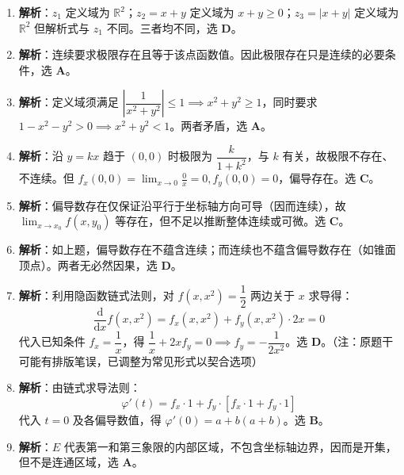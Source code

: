 \documentclass[lang=cn,11pt]{elegantbook}
\begin{document}
\begin{solution}
\begin{enumerate}
  \item \textbf{解析}：$z_1$ 定义域为 $\mathbb R^2$；$z_2=x+y$ 定义域为 $x+y \geq 0$；$z_3 = |x+y|$ 定义域为 $\mathbb R^2$ 但解析式与 $z_1$ 不同。三者均不同，选 \textbf{D}。
  \item \textbf{解析}：连续要求极限存在且等于该点函数值。因此极限存在只是连续的必要条件，选 \textbf{A}。
  \item \textbf{解析}：定义域须满足 $\left|\dfrac{1}{x^2+y^2}\right| \leq 1 \implies x^2+y^2 \geq 1$，同时要求 $1-x^2-y^2 > 0 \implies x^2+y^2 < 1$。两者矛盾，选 \textbf{A}。
  \item \textbf{解析}：沿 $y=kx$ 趋于 $(0,0)$ 时极限为 $\dfrac{k}{1+k^2}$，与 $k$ 有关，故极限不存在、不连续。但 $f_x(0,0) = \lim_{x\to 0}\frac{0}{x} = 0, f_y(0,0) = 0$，偏导存在。选 \textbf{C}。
  \item \textbf{解析}：偏导数存在仅保证沿平行于坐标轴方向可导（因而连续），故 $\lim_{x\to x_0}f(x,y_0)$ 等存在，但不足以推断整体连续或可微。选 \textbf{C}。
  \item \textbf{解析}：如上题，偏导数存在不蕴含连续；而连续也不蕴含偏导数存在（如锥面顶点）。两者无必然因果，选 \textbf{D}。
  \item \textbf{解析}：利用隐函数链式法则，对 $f(x,x^2)=\dfrac{1}{2}$ 两边关于 $x$ 求导得：
  \[
  \frac{\mathrm{d}}{\mathrm{d}x}f(x,x^2) = f_x(x,x^2) + f_y(x,x^2) \cdot 2x = 0
  \]
  代入已知条件 $f_x = \dfrac{1}{x}$，得 $\dfrac{1}{x} + 2x f_y = 0 \implies f_y = -\dfrac{1}{2x^2}$。选 \textbf{D}。（注：原题干可能有排版笔误，已调整为常见形式以契合选项）
  \item \textbf{解析}：由链式求导法则：
  \[
  \varphi'(t) = f_x \cdot 1 + f_y \cdot [f_x \cdot 1 + f_y \cdot 1]
  \]
  代入 $t=0$ 及各偏导数值，得 $\varphi'(0) = a + b(a+b)$。选 \textbf{B}。
  \item \textbf{解析}：$E$ 代表第一和第三象限的内部区域，不包含坐标轴边界，因而是开集，但不是连通区域，选 \textbf{A}。
\end{enumerate}
\end{solution}


\end{document}
